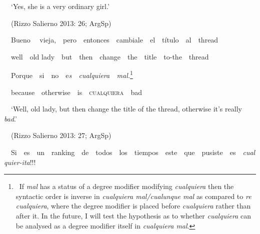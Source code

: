 \begin{styleStandard}
\ \ ‘Yes, she is a very ordinary girl.’
\end{styleStandard}

\begin{styleStandard}
\ \ (Rizzo Salierno 2013: 26; ArgSp)
\end{styleStandard}

\begin{styleStandard}
\ \ Bueno \ \ vieja,\ \ pero\ \ entonces\ \ cambiale\ \ el\ \ título\ \ al\ \ thread
\end{styleStandard}

\begin{styleStandard}
\ \ well\ \ old lady\ \ but\ \ then\ \ change\ \ the\ \ title\ \ to-the\ \ thread
\end{styleStandard}

\begin{styleStandard}
\ \ Porque\ \ si\ \ no\ \ e\textit{s\ \ cualquiera\ \ mal.}\footnote{\textrm{\ If }\textrm{\textit{mal}}\textrm{ has a status of a degree modifier modifying }\textrm{\textit{cualquiera}}\textrm{ then the syntactic order is inverse in }\textrm{\textit{cualquiera mal/cualunque mal}}\textrm{ as compared to }\textrm{\textit{re cualquiera}}\textrm{, where the degree modifier is placed before }\textrm{\textit{cualquiera}}\textrm{ rather than after it. In the future, I will test the hypothesis as to whether }\textrm{\textit{cualquiera}}\textrm{ can be analysed as a degree modifier itself in }\textrm{\textit{cualquiera mal}}\textrm{. }}
\end{styleStandard}

\begin{styleStandard}
\ \ because\ \ otherwise\ \ is\ \ \textsc{cualquiera}\textit{\ \ }bad
\end{styleStandard}

\begin{styleStandard}
\ \ ‘Well, old lady, but then change the title of the thread, otherwise it’s really \textit{bad}.’
\end{styleStandard}

\begin{styleStandard}
\ \ (Rizzo Salierno 2013: 27; ArgSp)
\end{styleStandard}

\begin{styleStandard}
\ \ Si\ \ es\ \ un\ \ ranking\ \ de\ \ todos\ \ los\ \ tiempos\ \ este\ \ que\ \ pusiste\ \ es\ \ \textit{cualquier-ita}!!!
\end{styleStandard}

